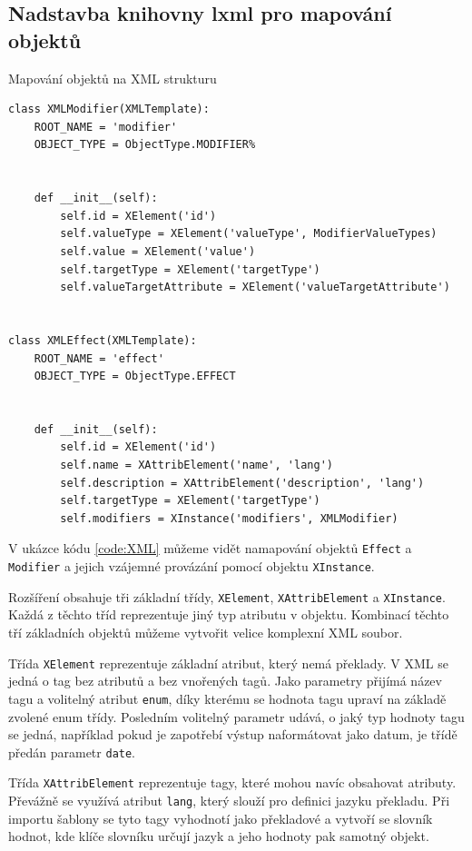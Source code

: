 \documentclass[thesis=B,czech]{resources/FITthesis}[2012/06/26]
\begin{document}
	\subsection{Nadstavba knihovny lxml pro mapování objektů}
	\begin{listing}[htbp]
\caption{\label{code:XML}Mapování objektů na XML strukturu}
\begin{verbatim}
class XMLModifier(XMLTemplate):
    ROOT_NAME = 'modifier'
    OBJECT_TYPE = ObjectType.MODIFIER%


    def __init__(self):
        self.id = XElement('id')
        self.valueType = XElement('valueType', ModifierValueTypes)
        self.value = XElement('value')
        self.targetType = XElement('targetType')
        self.valueTargetAttribute = XElement('valueTargetAttribute')


class XMLEffect(XMLTemplate):
    ROOT_NAME = 'effect'
    OBJECT_TYPE = ObjectType.EFFECT


    def __init__(self):
        self.id = XElement('id')
        self.name = XAttribElement('name', 'lang')
        self.description = XAttribElement('description', 'lang')
        self.targetType = XElement('targetType')
        self.modifiers = XInstance('modifiers', XMLModifier)
\end{verbatim}
\end{listing}
	 V ukázce kódu  \ref{code:XML} můžeme vidět namapování objektů \texttt{Effect} a \texttt{Modifier} a jejich vzájemné provázání pomocí objektu \texttt{XInstance}. \par

Rozšíření obsahuje tři základní třídy, \texttt{XElement}, \texttt{XAttribElement} a \texttt{XInstance}. Každá z těchto tříd reprezentuje jiný typ atributu v objektu. Kombinací těchto tří základních objektů můžeme vytvořit velice komplexní XML soubor. \par

Třída \texttt{XElement} reprezentuje základní atribut, který nemá překlady. V XML se jedná o tag bez atributů a bez vnořených tagů. Jako parametry přijímá název tagu a volitelný atribut \texttt{enum}, díky kterému se hodnota tagu upraví na základě zvolené enum třídy. Posledním volitelný parametr udává, o jaký typ hodnoty tagu se jedná, například pokud je zapotřebí výstup naformátovat jako datum, je třídě předán parametr \texttt{date}. \par

Třída \texttt{XAttribElement} reprezentuje tagy, které mohou navíc obsahovat atributy. Převážně se využívá atribut \texttt{lang}, který slouží pro definici jazyku překladu. Při importu šablony se tyto tagy vyhodnotí jako překladové a vytvoří se slovník hodnot, kde klíče slovníku určují jazyk a jeho hodnoty pak samotný objekt. \par
\end{document}
